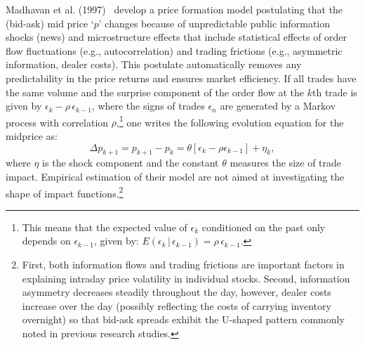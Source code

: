 Madhavan et al. (1997)~\cite{madhaven1997} develop a price formation model postulating that the (bid-ask) mid price `$p$' changes because of unpredictable public information shocks (news) and microstructure effects that include statistical effects of order flow fluctuations (e.g., autocorrelation) and trading frictions (e.g., asymmetric information, dealer costs). This postulate automatically removes any predictability in the price returns and ensures market efficiency. If all trades have the same volume and the surprise component of the order flow at the $k$th trade is given by $\epsilon_k - \rho \,\epsilon_{k-1}$, where the signs of trades $\epsilon_n$ are generated by a Markov process with correlation $\rho$,\footnote{This means that the expected value of $\epsilon_k$ conditioned on the past only depends on $\epsilon_{k-1}$, given by: $E(\epsilon_k\,|\,\epsilon_{k-1})=\rho\,\epsilon_{k-1}$.}  one writes the following evolution equation for the midprice as:
	\begin{equation}\label{eqn:midpointdelta}
	\Delta p_{k+1}=p_{k+1}-p_k=\theta[\epsilon_k - \rho \epsilon_{k-1}]+\eta_k,
	\end{equation}
where $\eta$ is the shock component and the constant $\theta$ measures the size of trade impact. Empirical estimation of their model are not aimed at investigating the shape of impact functions.\footnote{First, both information flows and trading frictions are important factors in explaining intraday price volatility in individual stocks. Second, information asymmetry decreases steadily throughout the day, however, dealer costs increase over the day (possibly reflecting the costs of carrying inventory overnight) so that bid-ask spreads exhibit the U-shaped pattern commonly noted in previous research studies.}


